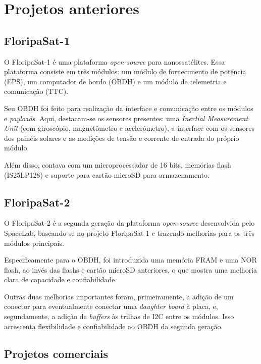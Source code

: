 
\section{Projetos anteriores}

\subsection{FloripaSat-1}
O FloripaSat-1 é uma plataforma \textit{open-source} para nanossatélites. Essa plataforma consiste em três módulos: um módulo de fornecimento de potência (EPS), um computador de bordo (OBDH) e um módulo de telemetria e comunicação (TTC).

Seu OBDH foi feito para realização da interface e comunicação entre os módulos e \textit{payloads}. Aqui, destacam-se os sensores presentes: uma \textit{Inertial Measurement Unit} (com giroscópio, magnetômetro e acelerômetro), a interface com os sensores dos painéis solares e as medições de tensão e corrente de entrada do próprio módulo.

Além disso, contava com um microprocessador de 16 bits, memórias flash (IS25LP128) e suporte para cartão microSD para armazenamento.

\subsection{FloripaSat-2}
O FloripaSat-2 é a segunda geração da plataforma \textit{open-source} desenvolvida pelo SpaceLab, baseando-se no projeto FloripaSat-1 e trazendo melhorias para os três módulos principais.

Especificamente para o OBDH, foi introduzida uma memória FRAM e uma NOR flash, ao invés das flashs e cartão microSD anteriores, o que mostra uma melhoria clara de capacidade e confiabilidade. 

Outras duas melhorias importantes foram, primeiramente, a adição de um conector para eventualmente conectar uma \textit{daughter board} à placa, e, segundamente, a adição de \textit{buffers} às trilhas de I2C entre os módulos. Isso acrescenta flexibilidade e confiabilidade ao OBDH da segunda geração.

\subsection{Projetos comerciais}

